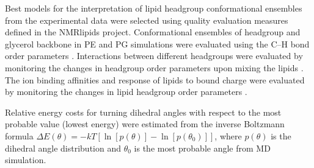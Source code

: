 \documentclass[aps,prl,superscriptaddress,twocolumn]{revtex4}
\begin{document}
Best models for the interpretation of lipid headgroup conformational ensembles from the experimental data were selected
using quality evaluation measures defined in the NMRlipids project.
Conformational ensembles of headgroup and glycerol backbone in PE and PG simulations were evaluated using the C--H bond order parameters \cite{botan15}. Interactions between different headgroups were evaluated by monitoring the changes in headgroup order parameters upon mixing the lipids \cite{antila19}. The ion binding affinities and response of lipids to bound charge were evaluated by monitoring the changes in lipid headgroup order parameters \cite{catte16,antila19}.

Relative energy costs for turning dihedral angles with respect to the most probable value (lowest energy) were estimated from the inverse Boltzmann formula $\Delta E(\theta) = -kT \left[\ln\left[p(\theta)\right]-\ln\left[p(\theta_0)\right] \right]$, where $p(\theta)$ is the dihedral angle distribution and $\theta_0$ is the most probable angle from MD simulation.
\end{document}
